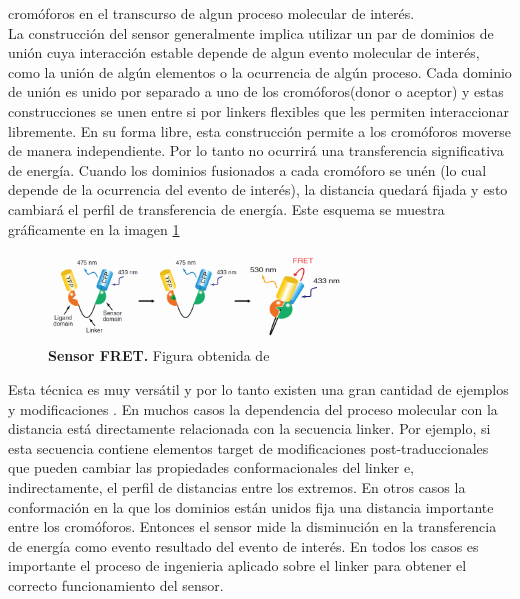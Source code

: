 \begin{itemize}
cromóforos en el transcurso de algun proceso molecular de interés. \\
La construcción del sensor generalmente implica utilizar un par de dominios de unión cuya interacción estable depende de algun evento molecular de interés, como la unión de algún elementos o la ocurrencia de algún proceso.
Cada dominio de unión es unido por separado a uno de los cromóforos(donor o aceptor) y estas construcciones se unen entre si por linkers flexibles que les permiten interaccionar libremente.
En su forma libre, esta construcción permite a los cromóforos moverse de manera independiente. Por lo tanto no ocurrirá una transferencia significativa de energía. 
Cuando los dominios fusionados a cada cromóforo se unén (lo cual depende de la ocurrencia del evento de interés), la distancia quedará fijada y esto cambiará el perfil de transferencia de energía.
Este esquema se muestra gráficamente en la imagen \ref{fretSensor}


\begin{figure}[h]
\centering
\includegraphics[width=0.7\textwidth]{img/fret.png} 
\caption{\textbf{Sensor FRET.} Figura obtenida de \cite{crone2013gfp}}
\label{fretSensor}
\end{figure}

Esta técnica es muy versátil y por lo tanto existen una gran cantidad de ejemplos y modificaciones \cite{vinkenborg2009genetically,qiao2006zinc}. %
En muchos casos la dependencia del proceso molecular con la distancia está directamente relacionada con la secuencia linker. Por ejemplo, si esta secuencia contiene elementos target de modificaciones post-traduccionales que pueden cambiar las propiedades conformacionales del linker e, indirectamente, el perfil de distancias entre los extremos. 
En otros casos la conformación en la que los dominios están unidos fija una distancia importante entre los cromóforos. Entonces el sensor mide la disminución en la transferencia de energía como evento resultado del evento de interés.
En todos los casos es importante el proceso de ingenieria aplicado sobre el linker para obtener el correcto funcionamiento del sensor.




\end{itemize}
